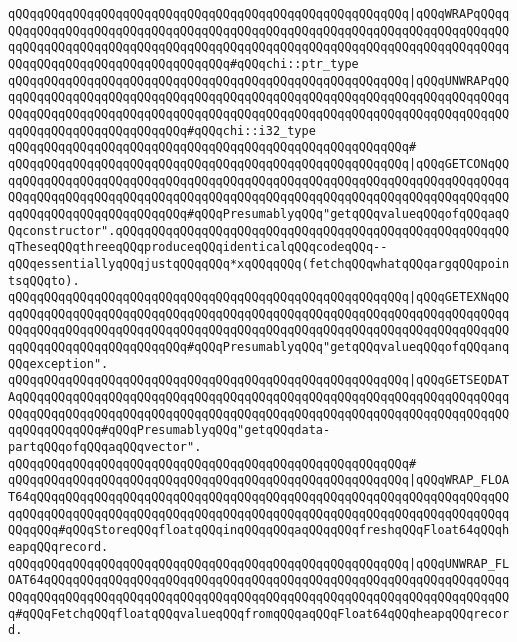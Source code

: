 \verb|qQQqqQQqqQQqqQQqqQQqqQQqqQQqqQQqqQQqqQQqqQQqqQQqqQQqqQQq|\verb#|qQQqWRAPqQQqqQQqqQQqqQQqqQQqqQQqqQQqqQQqqQQqqQQqqQQqqQQqqQQqqQQqqQQqqQQqqQQqqQQqqQQqqQQqqQQqqQQqqQQqqQQqqQQqqQQqqQQqqQQqqQQqqQQqqQQqqQQqqQQqqQQqqQQqqQQqqQQqqQQqqQQqqQQqqQQqqQQqqQQqqQQq#\verb|#qQQqchi::ptr_type|\newline
\verb|qQQqqQQqqQQqqQQqqQQqqQQqqQQqqQQqqQQqqQQqqQQqqQQqqQQqqQQq|\verb#|qQQqUNWRAPqQQqqQQqqQQqqQQqqQQqqQQqqQQqqQQqqQQqqQQqqQQqqQQqqQQqqQQqqQQqqQQqqQQqqQQqqQQqqQQqqQQqqQQqqQQqqQQqqQQqqQQqqQQqqQQqqQQqqQQqqQQqqQQqqQQqqQQqqQQqqQQqqQQqqQQqqQQqqQQqqQQqqQQq#\verb|#qQQqchi::i32_type|\newline
\verb|qQQqqQQqqQQqqQQqqQQqqQQqqQQqqQQqqQQqqQQqqQQqqQQqqQQqqQQq#|\newline
\verb|qQQqqQQqqQQqqQQqqQQqqQQqqQQqqQQqqQQqqQQqqQQqqQQqqQQqqQQq|\verb#|qQQqGETCONqQQqqQQqqQQqqQQqqQQqqQQqqQQqqQQqqQQqqQQqqQQqqQQqqQQqqQQqqQQqqQQqqQQqqQQqqQQqqQQqqQQqqQQqqQQqqQQqqQQqqQQqqQQqqQQqqQQqqQQqqQQqqQQqqQQqqQQqqQQqqQQqqQQqqQQqqQQqqQQqqQQqqQQq#\verb|#qQQqPresumablyqQQq"getqQQqvalueqQQqofqQQqaqQQqconstructor".qQQqqQQqqQQqqQQqqQQqqQQqqQQqqQQqqQQqqQQqqQQqqQQqqQQqqQQqTheseqQQqthreeqQQqproduceqQQqidenticalqQQqcodeqQQq--qQQqessentiallyqQQqjustqQQqqQQq*xqQQqqQQq(fetchqQQqwhatqQQqargqQQqpointsqQQqto).|\newline
\verb|qQQqqQQqqQQqqQQqqQQqqQQqqQQqqQQqqQQqqQQqqQQqqQQqqQQqqQQq|\verb#|qQQqGETEXNqQQqqQQqqQQqqQQqqQQqqQQqqQQqqQQqqQQqqQQqqQQqqQQqqQQqqQQqqQQqqQQqqQQqqQQqqQQqqQQqqQQqqQQqqQQqqQQqqQQqqQQqqQQqqQQqqQQqqQQqqQQqqQQqqQQqqQQqqQQqqQQqqQQqqQQqqQQqqQQqqQQqqQQq#\verb|#qQQqPresumablyqQQq"getqQQqvalueqQQqofqQQqanqQQqexception".|\newline
\verb|qQQqqQQqqQQqqQQqqQQqqQQqqQQqqQQqqQQqqQQqqQQqqQQqqQQqqQQq|\verb#|qQQqGETSEQDATAqQQqqQQqqQQqqQQqqQQqqQQqqQQqqQQqqQQqqQQqqQQqqQQqqQQqqQQqqQQqqQQqqQQqqQQqqQQqqQQqqQQqqQQqqQQqqQQqqQQqqQQqqQQqqQQqqQQqqQQqqQQqqQQqqQQqqQQqqQQqqQQqqQQqqQQq#\verb|#qQQqPresumablyqQQq"getqQQqdata-partqQQqofqQQqaqQQqvector".|\newline
\verb|qQQqqQQqqQQqqQQqqQQqqQQqqQQqqQQqqQQqqQQqqQQqqQQqqQQqqQQq#|\newline
\verb|qQQqqQQqqQQqqQQqqQQqqQQqqQQqqQQqqQQqqQQqqQQqqQQqqQQqqQQq|\verb#|qQQqWRAP_FLOAT64qQQqqQQqqQQqqQQqqQQqqQQqqQQqqQQqqQQqqQQqqQQqqQQqqQQqqQQqqQQqqQQqqQQqqQQqqQQqqQQqqQQqqQQqqQQqqQQqqQQqqQQqqQQqqQQqqQQqqQQqqQQqqQQqqQQqqQQqqQQqqQQq#\verb|#qQQqStoreqQQqfloatqQQqinqQQqqQQqaqQQqqQQqfreshqQQqFloat64qQQqheapqQQqrecord.|\newline
\verb|qQQqqQQqqQQqqQQqqQQqqQQqqQQqqQQqqQQqqQQqqQQqqQQqqQQqqQQq|\verb#|qQQqUNWRAP_FLOAT64qQQqqQQqqQQqqQQqqQQqqQQqqQQqqQQqqQQqqQQqqQQqqQQqqQQqqQQqqQQqqQQqqQQqqQQqqQQqqQQqqQQqqQQqqQQqqQQqqQQqqQQqqQQqqQQqqQQqqQQqqQQqqQQqqQQqqQQq#\verb|#qQQqFetchqQQqfloatqQQqvalueqQQqfromqQQqaqQQqFloat64qQQqheapqQQqrecord.|\newline
